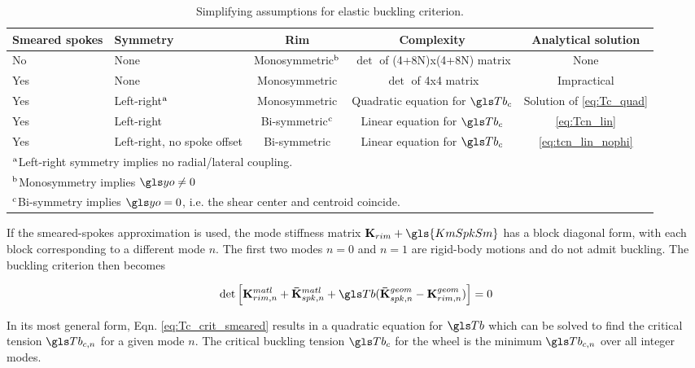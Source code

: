 \documentclass[\rootdir/thesis.tex]{subfiles}
\begin{document}
\begin{table}[t]
\caption{Simplifying assumptions for elastic buckling criterion.}
\label{tab:BucklingSolutions}
\begin{tabularx}{\textwidth}{p{1.2cm}Xccc}
\toprule
\centering Smeared spokes & \centering Symmetry & Rim & Complexity & Analytical solution\\
\midrule
\centering No  & \centering None & Monosymmetric$^{\rm b}$ & $\det$ of (4+8N)x(4+8N) matrix & None\\
\centering Yes & \centering None & Monosymmetric & $\det$ of 4x4 matrix & Impractical\\
\centering Yes & \centering Left-right$^{\rm a}$& Monosymmetric& Quadratic equation for $\Tb_c$ & Solution of \eqref{eq:Tc_quad}\\
\centering Yes & \centering Left-right& Bi-symmetric$^{\rm c}$ & Linear equation for $\Tb_c$ & \eqref{eq:Tcn_lin}\\
\centering Yes & \centering Left-right, no spoke offset & Bi-symmetric & Linear equation for $\Tb_c$ & \eqref{eq:tcn_lin_nophi}\\
\bottomrule
\multicolumn{5}{p{\textwidth}}{
$^{\rm a}$Left-right symmetry implies no radial/lateral coupling.
}\\
\multicolumn{5}{p{\textwidth}}{
$^{\rm b}$Monosymmetry implies $\yo\neq 0$
}\\
\multicolumn{5}{p{\textwidth}}{
$^{\rm c}$Bi-symmetry implies $\yo=0$, i.e. the shear center and centroid coincide.
}\\
\bottomrule
\end{tabularx}
\end{table}


If the smeared-spokes approximation is used, the mode stiffness matrix $\KmRim + \gls{KmSpkSm}$ has a block diagonal form, with each block corresponding to a different mode $n$. The first two modes $n=0$ and $n=1$ are rigid-body motions and do not admit buckling. The buckling criterion then becomes

\begin{equation}
\label{eq:Tc_crit_smeared}
\det{\left[\matl{\mathbf{K}_{rim,n}} + \matl{\mathbf{\bar{K}}_{spk,n}} + \Tb(\geom{\mathbf{\bar{K}}_{spk,n}} - \geom{\mathbf{K}_{rim,n}})\right]} = 0
\end{equation}

In its most general form, Eqn. \eqref{eq:Tc_crit_smeared} results in a quadratic equation for $\Tb$ which can be solved to find the critical tension $\Tb_{c,n}$ for a given mode $n$. The critical buckling tension $\Tb_c$ for the wheel is the minimum $\Tb_{c,n}$ over all integer modes.
\end{document}
